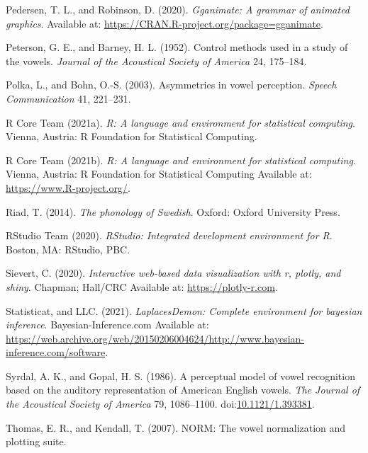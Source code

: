 \documentclass[utf8]{frontiers_suppmat} %
\newlength{\cslhangindent}
\newlength{\cslentryspacingunit} %
\newenvironment{CSLReferences}[2] %
 {%
  \setlength{\parindent}{0pt}
  \ifodd #1
  \let\oldpar\par
  \def\par{\hangindent=\cslhangindent\oldpar}
  \fi
  \setlength{\parskip}{#2\cslentryspacingunit}
 }%
 {}
\begin{document}
\begin{CSLReferences}{1}{0}
\leavevmode{}%
Pedersen, T. L., and Robinson, D. (2020). \emph{Gganimate: A grammar of animated graphics}. Available at: \url{https://CRAN.R-project.org/package=gganimate}.

\leavevmode{}%
Peterson, G. E., and Barney, H. L. (1952). Control methods used in a study of the vowels. \emph{Journal of the Acoustical Society of America} 24, 175--184.

\leavevmode{}%
Polka, L., and Bohn, O.-S. (2003). Asymmetries in vowel perception. \emph{Speech Communication} 41, 221--231.

\leavevmode{}%
R Core Team (2021a). \emph{R: {A} language and environment for statistical computing}. {Vienna, Austria}: {R Foundation for Statistical Computing}.

\leavevmode{}%
R Core Team (2021b). \emph{R: A language and environment for statistical computing}. Vienna, Austria: R Foundation for Statistical Computing Available at: \url{https://www.R-project.org/}.

\leavevmode{}%
Riad, T. (2014). \emph{The phonology of {Swedish}}. {Oxford}: {Oxford University Press}.

\leavevmode{}%
RStudio Team (2020). \emph{{RStudio}: {Integrated} development environment for {R}}. {Boston, MA}: {RStudio, PBC.}

\leavevmode{}%
Sievert, C. (2020). \emph{Interactive web-based data visualization with r, plotly, and shiny}. Chapman; Hall/CRC Available at: \url{https://plotly-r.com}.

\leavevmode{}%
Statisticat, and LLC. (2021). \emph{LaplacesDemon: Complete environment for bayesian inference}. Bayesian-Inference.com Available at: \url{https://web.archive.org/web/20150206004624/http://www.bayesian-inference.com/software}.

\leavevmode{}%
Syrdal, A. K., and Gopal, H. S. (1986). A perceptual model of vowel recognition based on the auditory representation of {American English} vowels. \emph{The Journal of the Acoustical Society of America} 79, 1086--1100. doi:\href{https://doi.org/10.1121/1.393381}{10.1121/1.393381}.

\leavevmode{}%
Thomas, E. R., and Kendall, T. (2007). {NORM}: {The} vowel normalization and plotting suite.


\end{CSLReferences}
\end{document}
